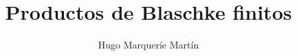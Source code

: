 \documentclass[a4paper,11pt,spanish, twoside]{tfg-uam-matematicas_25-26}
\title{Productos de Blaschke finitos}
\author{Hugo Marqueríe Martín}
\begin{document}
    \frontmatter

    \setlength{\abovedisplayskip}{6pt}
    \setlength{\belowdisplayskip}{8pt}
    
    \cleardoublepage

    
    \cleardoublepage

    \mainmatter

    
    
    
    
    

    \appendix
    
    
    



    \nocite{daeppBeautyBlaschkeProducts2021}

    \printbibliography    

    \cleardoublepage
\end{document}
